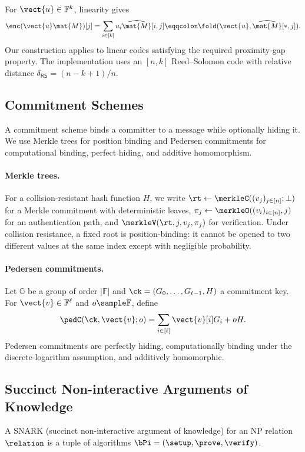 For $\vect{u}\in\mathbb{F}^k$, linearity gives
\[
  \enc(\vect{u}\mat{M})[j]
  =\sum_{i\in[k]}u_i\widehat{\mat{M}}[i,j]
  \eqqcolon\fold(\vect{u},\widehat{\mat{M}}[*,j]).
\]
Our construction applies to linear codes satisfying the required proximity-gap
property.  The implementation uses an $[n,k]$ Reed--Solomon code with relative
distance $\delta_{\mathsf{RS}}=(n-k+1)/n$.

\subsection{Commitment Schemes}
\label{sec:prelim-commitments}

A commitment scheme binds a committer to a message while optionally hiding it.
We use Merkle trees for position binding and Pedersen commitments for
computational binding, perfect hiding, and additive homomorphism.

\paragraph{Merkle trees.}
For a collision-resistant hash function $H$, we write
$\rt\gets\merkleC((v_j)_{j\in[n]};\bot)$ for a Merkle commitment with
deterministic leaves, $\pi_j\gets\merkleO((v_i)_{i\in[n]},j)$ for an
authentication path, and $\merkleV(\rt,j,v_j,\pi_j)$ for verification.  Under
collision resistance, a fixed root is position-binding: it cannot be opened to
two different values at the same index except with negligible probability.

\paragraph{Pedersen commitments.}
Let $\mathbb{G}$ be a group of order $|\mathbb{F}|$ and
$\ck=(G_0,\ldots,G_{\ell-1},H)$ a commitment key.  For
$\vect{v}\in\mathbb{F}^{\ell}$ and $o\sample\mathbb{F}$, define
\[
  \pedC(\ck,\vect{v};o)
  =\sum_{i\in[\ell]}\vect{v}[i]G_i+oH.
\]
Pedersen commitments are perfectly hiding, computationally binding under the
discrete-logarithm assumption, and additively homomorphic.


\subsection{Succinct Non-interactive Arguments of Knowledge}
\label{sec:prelim-snark}

A SNARK (succinct non-interactive argument of knowledge) for an NP relation
$\relation$ is a tuple of algorithms $\bPi=(\setup,\prove,\verify)$.

